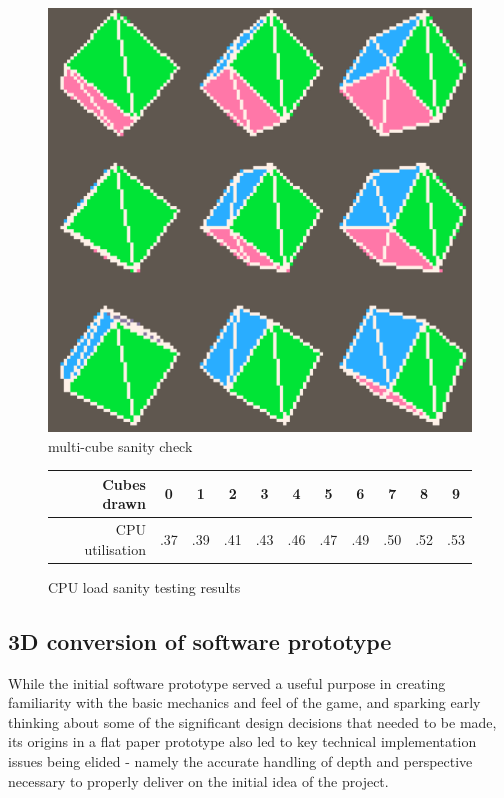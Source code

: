 \documentclass[11pt]{article}
\begin{document}
\begin{figure}[h]
  \centering
  \includegraphics[width=.8\linewidth]{test3d}
  \caption{multi-cube sanity check}
  \label{fig:3dfig2}
\end{figure}

\begin{figure}[h]
\begin{center}
\begin{tabular}{r|c c c c c c c c c c}
     Cubes drawn & 0 & 1 & 2 & 3 & 4 & 5 & 6 & 7 & 8 & 9 \\
     \hline
     CPU utilisation & .37 & .39 & .41 & .43 & .46 & .47 & .49 & .50 & .52 & .53
\end{tabular}
\end{center}
\caption{CPU load sanity testing results}
\label{fig:3dtest}
\end{figure}

\subsection{3D conversion of software prototype}\label{conversion}

While the initial software prototype served a useful purpose in creating familiarity
with the basic mechanics and feel of the game, and sparking early thinking about some of the
significant design decisions that needed to be made, its origins in a flat paper prototype
also led to key technical implementation issues being elided - namely the accurate handling
of depth and perspective necessary to properly deliver on the initial idea of the project.
\end{document}
